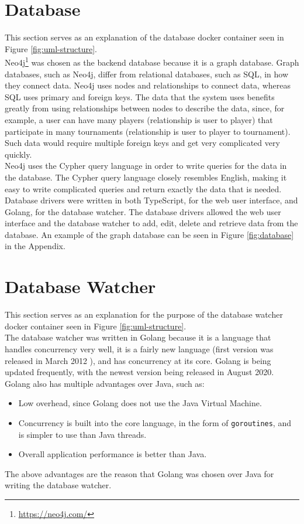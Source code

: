 \documentclass[a4paper, 11pt]{report}
\begin{document}
\section{Database}

This section serves as an explanation of the database docker container seen in
Figure \ref{fig:uml-structure}. \\

Neo4j\footnote{\url{https://neo4j.com/}} was chosen as the backend database
because it is a graph database. Graph databases, such as Neo4j, differ from
relational databases, such as SQL, in how they connect data. Neo4j uses nodes
and relationships to connect data, whereas SQL uses primary and foreign keys.
The data that the system uses benefits greatly from using relationships between
nodes to describe the data, since, for example, a user can have many players
(relationship is user to player) that participate in many tournaments (relationship
is user to player to tournament). Such data would require multiple foreign keys
and get very complicated very quickly. \\

Neo4j uses the Cypher query language in order to write queries for the data in
the database. The Cypher query language closely resembles English, making it easy
to write complicated queries and return exactly the data that is needed. Database
drivers were written in both TypeScript, for the web user interface, and Golang,
for the database watcher. The database drivers allowed the web user interface
and the database watcher to add, edit, delete and retrieve data from the
database. An example of the graph database can be seen in Figure \ref{fig:database}
in the Appendix.

\section{Database Watcher}

This section serves as an explanation for the purpose of the database watcher
docker container seen in Figure \ref{fig:uml-structure}. \\

The database watcher was written in Golang because it is a language that handles
concurrency very well, it is a fairly new language (first version was released
in March 2012 \cite{golang}), and has concurrency at its core. Golang is being
updated frequently, with the newest version being released in August 2020. Golang
also has multiple advantages over Java, such as:
\begin{itemize}
	\item Low overhead, since Golang does not use the Java Virtual Machine.
	\item Concurrency is built into the core language, in the form of \texttt{goroutines},
	and is simpler to use than Java threads.
	\item Overall application performance is better than Java.
\end{itemize}
The above advantages are the reason that Golang was chosen over Java for writing
the database watcher. \\
\end{document}
